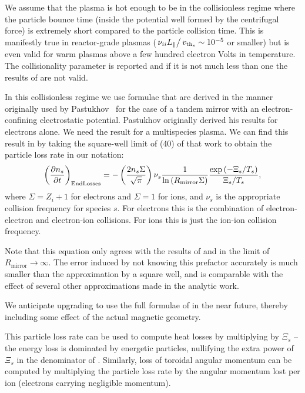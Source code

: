 \documentclass{revtex4-2}
\begin{document}
We assume that the plasma is hot enough to be in the collisionless regime where the particle bounce time (inside the potential well formed by the centrifugal force) is extremely short compared to the particle collision time. This is manifestly true in reactor-grade plasmas ($\left.\nu_{ii} L_\parallel \right/ v_{\mathrm{th}_s} \sim 10^{-5}$ or smaller) but is even valid for warm plasmas above a few hundred electron Volts in temperature. The collisionality parameter is reported and if it is not much less than one the results of \mctrans{} are not valid.

In this collisionless regime we use formulae that are derived in the manner originally used by Pastukhov~\cite{Pastukhov1974} for the case of a tandem mirror with an electron-confining electrostatic potential. Pastukhov originally derived his results for electrons alone. We need the result for a multispecies plasma.  
We can find this result in \citet{CattoBernsteinMirror1} by taking the square-well limit of (40) of that work to obtain the particle loss rate in our notation:
\begin{equation}
\left( \frac{\partial n_s} {\partial t} \right)_{\mathrm{End Losses}} = 
	- \left( \frac{2 n_s \Sigma}{\sqrt{\pi}} \right) \nu_s \frac{1}{\ln\left( R_{\mathrm{mirror}} \Sigma\right)} \frac{\exp\left( -\Xi_s/T_s \right)}{\Xi_s/T_s},
	\label{ParticleLossRate}
\end{equation}
where $\Sigma = Z_i + 1$ for electrons and $\Sigma = 1$ for ions, and $\nu_s$ is the appropriate collision frequency for species $s$. For electrons this is the combination of electron-electron and electron-ion collisions. For ions this is just the ion-ion collision frequency.

Note that this equation only agrees with the results of \citet{Pastukhov1974} and \citet{cohen1978collisional} in the limit of $R_{\mathrm{mirror}} \rightarrow \infty$. The error induced by not knowing this prefactor accurately is much smaller than the approximation by a square well, and is comparable with the effect of several other approximations made in the analytic work.

We anticipate upgrading \mctrans{} to use the full formulae of \citet{CattoBernsteinMirror1} in the near future, thereby including some effect of the actual magnetic geometry.

This particle loss rate can be used to compute heat losses by multiplying by $\Xi_s$ -- the energy loss is dominated by energetic particles, nullifying the extra power of $\Xi_s$ in the denominator of . Similarly, loss of toroidal angular momentum can be computed by multiplying the particle loss rate by the angular momentum lost per ion (electrons carrying negligible momentum).
\end{document}
